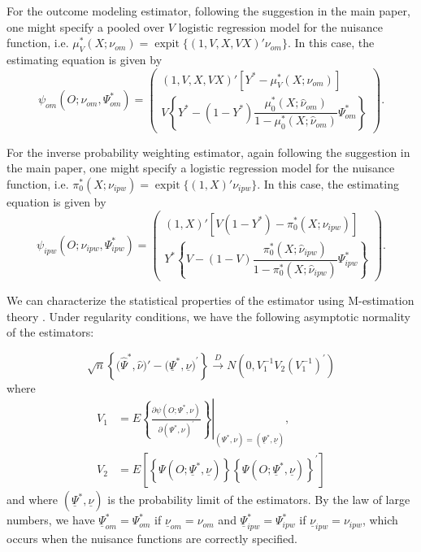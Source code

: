 \begin{appendix}
\begin{refsection}
    For the outcome modeling estimator, following the suggestion in the main paper, one might specify a pooled over $V$ logistic regression model for the nuisance function, i.e. $\mu^*_V(X; \nu_{om}) = \operatorname{expit}\{(1, V, X, VX)'\nu_{om}\}$. In this case, the estimating equation is given by 
    \begin{equation*}
        \psi_{om}(O; \nu_{om}, \Psi^*_{om}) = \begin{pmatrix}
            (1, V, X, VX)'\left[ Y^* - \mu^*_V(X; \nu_{om})\right] \\
            V \left\{Y^* - (1 - Y^*) \dfrac{\mu^*_0(X; \widehat{\nu}_{om})}{1 - \mu^*_0(X; \widehat{\nu}_{om})}\Psi^*_{om}\right\}
        \end{pmatrix}.
    \end{equation*}

    For the inverse probability weighting estimator, again following the suggestion in the main paper, one might specify a logistic regression model for the nuisance function, i.e. $\pi^*_0(X; \nu_{ipw}) = \operatorname{expit}\{(1, X)'\nu_{ipw}\}$. In this case, the estimating equation is given by 
    \begin{equation*}
        \psi_{ipw}(O; \nu_{ipw}, \Psi^*_{ipw}) = \begin{pmatrix}
            (1, X)'\left[V(1-Y^*) - \pi^*_0(X; \nu_{ipw})\right] \\
            Y^* \left\{V - (1-V) \dfrac{\pi^*_0(X; \widehat{\nu}_{ipw})}{1 - \pi^*_0(X; \widehat{\nu}_{ipw})}\Psi^*_{ipw}\right\}
        \end{pmatrix}.
    \end{equation*}

    We can characterize the statistical properties of the estimator using M-estimation theory \cite{stefanski_calculus_2002}. Under regularity conditions, we have the following asymptotic normality of the estimators:

    \[\sqrt{n}\left\{\big(\widehat{\Psi}^*, \widehat{\nu}\big)'-\big(\underline{\Psi}^*, \underline{\nu}\big)^\prime \right\} \xrightarrow{D} N\left(0, V_1^{-1} V_2\left(V_1^{-1}\right)^{\prime}\right)\]
    where 
    \begin{align*}
        V_1&=\left.E\left\{\frac{\partial \psi\left(O ; \Psi^*, \nu\right)}{\partial\left(\Psi^*, \nu\right)^{\prime}}\right\}\right|_{\left(\Psi^*, \nu\right)=\left(\underline{\Psi}^*, \underline{\nu}\right)}, \\
        V_2&=E\left[\left\{\Psi\left(O ;\underline{\Psi}^*, \underline{\nu}\right)\right\}\left\{\Psi\left(O ; \underline{\Psi}^*, \underline{\nu}\right)\right\}^{\prime}\right]
    \end{align*}
and where $\left(\underline{\Psi}^*, \underline{\nu}\right)$ is the probability limit of the estimators. By the law of large numbers, we have $\underline{\Psi}^*_{om}=\Psi^*_{om}$ if  $\underline{\nu}_{om}=\nu_{om}$ and $\underline{\Psi}^*_{ipw}=\Psi^*_{ipw}$ if $\underline{\nu}_{ipw}=\nu_{ipw}$, which occurs when the nuisance functions are correctly specified.


\end{refsection}
\end{appendix}
